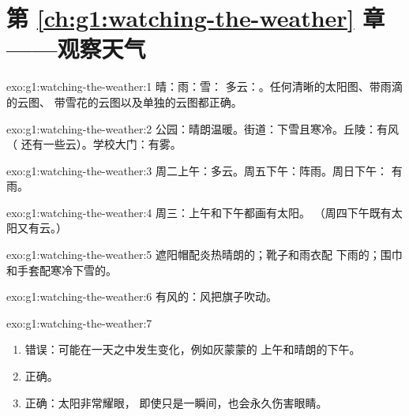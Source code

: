 \section*{第 \ref{ch:g1:watching-the-weather} 章——观察天气}

\begin{solution}{exo:g1:watching-the-weather:1}
晴：\quad 雨：\quad 雪：\quad
多云：。任何清晰的太阳图、带雨滴的云图、
带雪花的云图以及单独的云图都正确。
\end{solution}

\begin{solution}{exo:g1:watching-the-weather:2}
公园：晴朗温暖。街道：下雪且寒冷。丘陵：有风（
还有一些云）。学校大门：有雾。
\end{solution}

\begin{solution}{exo:g1:watching-the-weather:3}
周二上午：多云。周五下午：阵雨。周日下午：
有雨。
\end{solution}

\begin{solution}{exo:g1:watching-the-weather:4}
周三：上午和下午都画有太阳。
（周四下午既有太阳又有云。）
\end{solution}

\begin{solution}{exo:g1:watching-the-weather:5}
遮阳帽配炎热晴朗的；靴子和雨衣配
下雨的；围巾和手套配寒冷下雪的。
\end{solution}

\begin{solution}{exo:g1:watching-the-weather:6}
有风的：风把旗子吹动。
\end{solution}

\begin{solution}{exo:g1:watching-the-weather:7}
\begin{enumerate}
  \item 错误：可能在一天之中发生变化，例如灰蒙蒙的
        上午和晴朗的下午。
  \item 正确。
  \item 正确：太阳非常耀眼，
        即使只是一瞬间，也会永久伤害眼睛。
\end{enumerate}
\end{solution}

